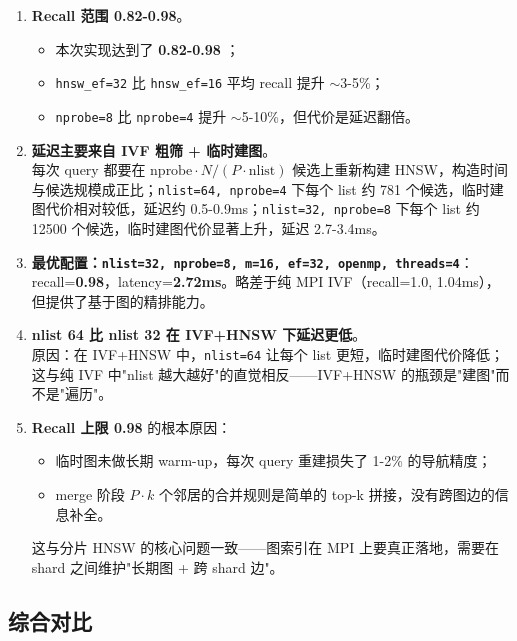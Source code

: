 \documentclass[a4paper]{article}
\begin{document}
\begin{enumerate}
    \item \textbf{Recall 范围 0.82-0.98}。
    \begin{itemize}
        \item 本次实现达到了 \textbf{0.82-0.98} ；
        \item \texttt{hnsw\_ef=32} 比 \texttt{hnsw\_ef=16} 平均 recall 提升 $\sim$3-5\%；
        \item \texttt{nprobe=8} 比 \texttt{nprobe=4} 提升 $\sim$5-10\%，但代价是延迟翻倍。
    \end{itemize}

    \item \textbf{延迟主要来自 IVF 粗筛 + 临时建图}。\\
    每次 query 都要在 $\text{nprobe} \cdot N/(P \cdot \text{nlist})$ 候选上重新构建 HNSW，构造时间与候选规模成正比；\texttt{nlist=64, nprobe=4} 下每个 list 约 781 个候选，临时建图代价相对较低，延迟约 0.5-0.9ms；\texttt{nlist=32, nprobe=8} 下每个 list 约 12500 个候选，临时建图代价显著上升，延迟 2.7-3.4ms。

    \item \textbf{最优配置：\texttt{nlist=32, nprobe=8, m=16, ef=32, openmp, threads=4}}：recall=\textbf{0.98}，latency=\textbf{2.72ms}。略差于纯 MPI IVF（recall=1.0, 1.04ms），但提供了基于图的精排能力。

    \item \textbf{nlist 64 比 nlist 32 在 IVF+HNSW 下延迟更低}。\\
    原因：在 IVF+HNSW 中，\texttt{nlist=64} 让每个 list 更短，临时建图代价降低；这与纯 IVF 中"nlist 越大越好"的直觉相反——IVF+HNSW 的瓶颈是"建图"而不是"遍历"。

    \item \textbf{Recall 上限 0.98} 的根本原因：
    \begin{itemize}
        \item 临时图未做长期 warm-up，每次 query 重建损失了 1-2\% 的导航精度；
        \item merge 阶段 $P \cdot k$ 个邻居的合并规则是简单的 top-k 拼接，没有跨图边的信息补全。
    \end{itemize}
    这与分片 HNSW 的核心问题一致——图索引在 MPI 上要真正落地，需要在 shard 之间维护"长期图 + 跨 shard 边"。
\end{enumerate}

\subsection{综合对比}
\end{document}
